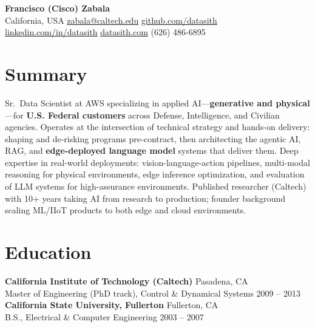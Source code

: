 \documentclass[11pt]{article}
\begin{document}
\begin{center}
{\LARGE \textbf{Francisco (Cisco) Zabala}}\\
California, USA \enspace\textbullet\enspace 
\href{mailto:zabala@caltech.edu}{zabala@caltech.edu} \enspace\textbullet\enspace 
\href{https://github.com/datasith}{github.com/datasith} 
\enspace\textbullet\enspace 
\href{https://linkedin.com/in/datasith}{linkedin.com/in/datasith} 
\enspace\textbullet\enspace \href{https://datasith.com}{datasith.com} 
\enspace\textbullet\enspace (626) 486-6895
\end{center}

\section*{Summary}
Sr.\ Data Scientist at AWS specializing in applied AI---\textbf{generative and physical}---for \textbf{U.S. Federal customers} across Defense, Intelligence, and Civilian agencies. Operates at the intersection of technical strategy and hands-on delivery: shaping and de-risking programs pre-contract, then architecting the agentic AI, RAG, and \textbf{edge-deployed language model} systems that deliver them. Deep expertise in real-world deployments: vision-language-action pipelines, multi-modal reasoning for physical environments, edge inference optimization, and evaluation of LLM systems for high-assurance environments.
Published researcher (Caltech) with 10+ years taking AI from research to production; founder background scaling ML/IIoT products to both edge and cloud environments.

\section*{Education}
\textbf{California Institute of Technology (Caltech)} \hfill Pasadena, CA\\
Master of Engineering (PhD track), Control \& Dynamical Systems \hfill 2009 -- 2013\\
\textbf{California State University, Fullerton} \hfill Fullerton, CA\\
B.S., Electrical \& Computer Engineering \hfill 2003 -- 2007
\end{document}
